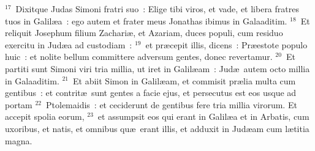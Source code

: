 ${}^{17}$~Dixitque Judas Simoni fratri suo~: Elige tibi viros, et vade, et libera fratres tuos in Galil\ae a~: ego autem et frater meus Jonathas ibimus in Galaaditim.
${}^{18}$~Et reliquit Josephum filium Zachari\ae , et Azariam, duces populi, cum residuo exercitu in Jud\ae a ad custodiam~:
${}^{19}$~et pr\ae cepit illis, dicens~: Pr\ae estote populo huic~: et nolite bellum committere adversum gentes, donec revertamur.
${}^{20}$~Et partiti sunt Simoni viri tria millia, ut iret in Galil\ae am~: Jud\ae\ autem octo millia in Galaaditim.
${}^{21}$~Et abiit Simon in Galil\ae am, et commisit pr\ae lia multa cum gentibus~: et contrit\ae\ sunt gentes a facie ejus, et persecutus est eos usque ad portam
${}^{22}$~Ptolemaidis~: et ceciderunt de gentibus fere tria millia virorum. Et accepit spolia eorum,
${}^{23}$~et assumpsit eos qui erant in Galil\ae a et in Arbatis, cum uxoribus, et natis, et omnibus qu\ae\ erant illis, et adduxit in Jud\ae am cum l\ae titia magna.


